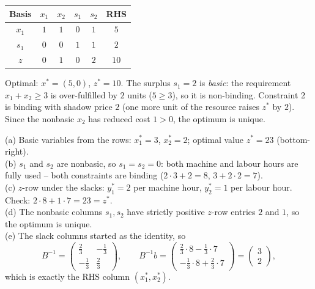 \begin{solutions}
\begin{center}
        \begin{tabular}{c|cccc|c}
        Basis & $x_{1}$ & $x_{2}$ & $s_{1}$ & $s_{2}$ & RHS\\
        \hline
        $x_{1}$ & $1$ & $1$ & $0$ & $1$ & $5$\\
        $s_{1}$ & $0$ & $0$ & $1$ & $1$ & $2$\\
        \hline
        $z$ & $0$ & $1$ & $0$ & $2$ & $10$\\
        \end{tabular}
        \end{center}
        Optimal: $x^{*}=(5,0)$, $z^{*}=10$. The surplus $s_{1}=2$ is
        \emph{basic}: the requirement $x_{1}+x_{2}\ge 3$ is over-fulfilled
        by $2$ units ($5\ge 3$), so it is non-binding. Constraint 2 is
        binding with shadow price $2$ (one more unit of the resource
        raises $z^{*}$ by $2$). Since the nonbasic $x_{2}$ has reduced cost
        $1>0$, the optimum is unique.

  \item (a) Basic variables from the rows: $x_{1}^{*}=3$, $x_{2}^{*}=2$;
        optimal value $z^{*}=23$ (bottom-right).\\
        (b) $s_{1}$ and $s_{2}$ are nonbasic, so $s_{1}=s_{2}=0$: both
        machine and labour hours are fully used -- both constraints are
        binding ($2\cdot 3+2=8$, $3+2\cdot 2=7$).\\
        (c) $z$-row under the slacks: $y_{1}^{*}=2$ per machine hour,
        $y_{2}^{*}=1$ per labour hour. Check:
        $2\cdot 8+1\cdot 7=23=z^{*}$.\\
        (d) The nonbasic columns $s_{1},s_{2}$ have strictly positive
        $z$-row entries $2$ and $1$, so the optimum is unique.\\
        (e) The slack columns started as the identity, so
        \[
          B^{-1}=
          \begin{pmatrix}
            \tfrac{2}{3} & -\tfrac{1}{3}\\[2pt]
            -\tfrac{1}{3} & \tfrac{2}{3}
          \end{pmatrix},
          \qquad
          B^{-1}b=
          \begin{pmatrix}
            \tfrac{2}{3}\cdot 8-\tfrac{1}{3}\cdot 7\\[2pt]
            -\tfrac{1}{3}\cdot 8+\tfrac{2}{3}\cdot 7
          \end{pmatrix}
          =\begin{pmatrix}3\\2\end{pmatrix},
        \]
        which is exactly the RHS column $(x_{1}^{*},x_{2}^{*})$.


\end{solutions}
